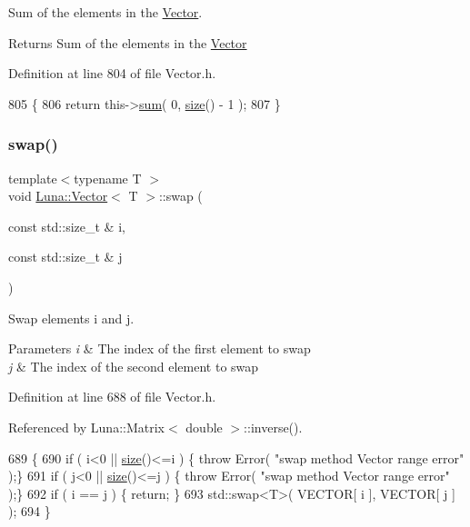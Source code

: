 Sum of the elements in the \hyperlink{classLuna_1_1Vector}{Vector}. 

\begin{DoxyReturn}{Returns}
Sum of the elements in the \hyperlink{classLuna_1_1Vector}{Vector} 
\end{DoxyReturn}


Definition at line 804 of file Vector.\+h.


\begin{DoxyCode}
805   \{
806     \textcolor{keywordflow}{return} this->\hyperlink{classLuna_1_1Vector_a3f9422b246093b153a55577a6ca97e26}{sum}( 0, \hyperlink{classLuna_1_1Vector_ac9b6ed7a0df401728f27c193fbc8f4d8}{size}() - 1 );
807   \}
\end{DoxyCode}
\mbox{\label{classLuna_1_1Vector_af910058597a627cc4257ea668e916b90}} 
\subsubsection{\texorpdfstring{swap()}{swap()}}
{\footnotesize\ttfamily template$<$typename T $>$ \\
void \hyperlink{classLuna_1_1Vector}{Luna\+::\+Vector}$<$ T $>$\+::swap (\begin{DoxyParamCaption}\item[{const std\+::size\+\_\+t \&}]{i,  }\item[{const std\+::size\+\_\+t \&}]{j }\end{DoxyParamCaption})\hspace{0.3cm}{\ttfamily [inline]}}



Swap elements i and j. 


\begin{DoxyParams}{Parameters}
{\em i} & The index of the first element to swap \\
\hline
{\em j} & The index of the second element to swap \\
\hline
\end{DoxyParams}


Definition at line 688 of file Vector.\+h.



Referenced by Luna\+::\+Matrix$<$ double $>$\+::inverse().


\begin{DoxyCode}
689   \{
690     \textcolor{keywordflow}{if} ( i<0 || \hyperlink{classLuna_1_1Vector_ac9b6ed7a0df401728f27c193fbc8f4d8}{size}()<=i ) \{ \textcolor{keywordflow}{throw} Error( \textcolor{stringliteral}{"swap method Vector range error"} );\}
691     \textcolor{keywordflow}{if} ( j<0 || \hyperlink{classLuna_1_1Vector_ac9b6ed7a0df401728f27c193fbc8f4d8}{size}()<=j ) \{ \textcolor{keywordflow}{throw} Error( \textcolor{stringliteral}{"swap method Vector range error"} );\}
692     \textcolor{keywordflow}{if} ( i == j ) \{ \textcolor{keywordflow}{return}; \}
693     std::swap<T>( VECTOR[ i ], VECTOR[ j ] );
694   \}
\end{DoxyCode}


